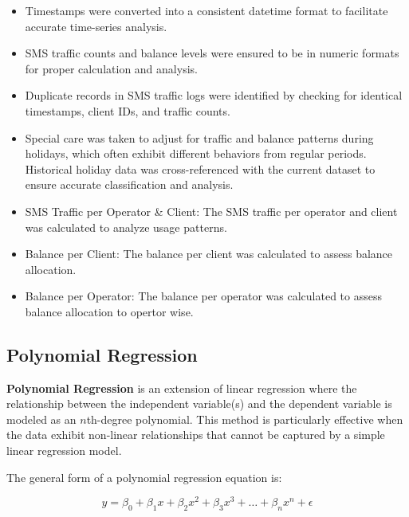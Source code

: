 \documentclass[12pt]{book} %
\begin{document}
\begin{itemize}
    \item Timestamps were converted into a consistent datetime format to facilitate accurate time-series analysis.
    \item SMS traffic counts and balance levels were ensured to be in numeric formats for proper calculation and analysis.
    \item Duplicate records in SMS traffic logs were identified by checking for identical timestamps, client IDs, and traffic counts.
    \item Special care was taken to adjust for traffic and balance patterns during holidays, which often exhibit different behaviors from regular periods. Historical holiday data was cross-referenced with the current dataset to ensure accurate classification and analysis.
    \item  SMS Traffic per Operator \& Client: The SMS traffic per operator and client was calculated to analyze usage patterns.
    \item Balance per Client: The balance per client was calculated to assess balance allocation.
    \item Balance per Operator: The balance per operator was calculated to assess balance allocation to opertor wise.
\end{itemize}


















\subsection{Polynomial Regression}

\textbf{Polynomial Regression} is an extension of linear regression where the relationship between the independent variable(s) and the dependent variable is modeled as an $n$th-degree polynomial. This method is particularly effective when the data exhibit non-linear relationships that cannot be captured by a simple linear regression model.

The general form of a polynomial regression equation is:

\[
y = \beta_0 + \beta_1 x + \beta_2 x^2 + \beta_3 x^3 + \dots + \beta_n x^n + \epsilon
\]
\end{document}
